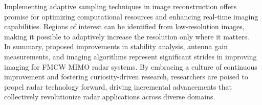 Implementing adaptive sampling techniques in image reconstruction offers promise for optimizing
computational resources and enhancing real-time imaging capabilities.
Regions of interest can be identified from low-resolution images,
making it possible to adaptively increase the resolution only where it matters.
\\

In summary, proposed improvements in stability analysis,
antenna gain measurements, and imaging algorithms represent significant strides in improving imaging for FMCW MIMO radar systems.
By embracing a culture of continuous improvement and fostering curiosity-driven research, 
researchers are poised to propel radar technology forward,
driving incremental advancements that collectively revolutionize radar applications across diverse domains.

